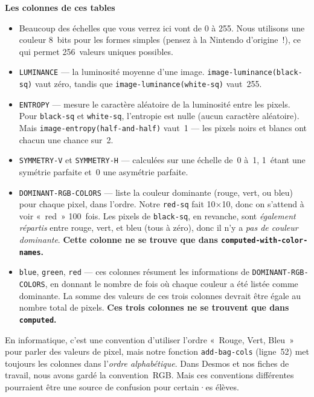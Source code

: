 \documentclass[12pt,a4paper]{article}
\begin{document}
\begin{keypointbox}
  \textbf{Les colonnes de ces tables}

  \begin{itemize}
    \item Beaucoup des échelles que vous verrez ici vont de 0 à 255. Nous utilisons une couleur 8~bits pour les formes simples (pensez à la Nintendo d'origine~!), ce qui permet 256~valeurs uniques possibles.
    \item \texttt{LUMINANCE} — la luminosité moyenne d'une image. \texttt{image-luminance(black-sq)} vaut zéro, tandis que \texttt{image-luminance(white-sq)} vaut~255.
    \item \texttt{ENTROPY} — mesure le caractère aléatoire de la luminosité entre les pixels. Pour \texttt{black-sq} et \texttt{white-sq}, l'entropie est nulle (aucun caractère aléatoire). Mais \texttt{image-entropy(half-and-half)} vaut~1 — les pixels noirs et blancs ont chacun une chance sur~2.
    \item \texttt{SYMMETRY-V} et \texttt{SYMMETRY-H} — calculées sur une échelle de~0 à~1, 1~étant une symétrie parfaite et~0 une asymétrie parfaite.
    \item \texttt{DOMINANT-RGB-COLORS} — liste la couleur dominante (rouge, vert, ou bleu) pour chaque pixel, dans l'ordre. Notre \texttt{red-sq} fait 10$\times$10, donc on s'attend à voir «~red~» 100~fois. Les pixels de \texttt{black-sq}, en revanche, sont \emph{également répartis} entre rouge, vert, et bleu (tous à zéro), donc il n'y a \emph{pas de couleur dominante}. \textbf{Cette colonne ne se trouve que dans \texttt{computed-with-color-names}.}
    \item \texttt{blue}, \texttt{green}, \texttt{red} — ces colonnes résument les informations de \texttt{DOMINANT-RGB-COLORS}, en donnant le nombre de fois où chaque couleur a été listée comme dominante. La somme des valeurs de ces trois colonnes devrait être égale au nombre total de pixels. \textbf{Ces trois colonnes ne se trouvent que dans \texttt{computed}.}
  \end{itemize}

  \vspace{0.3em}
  En informatique, c'est une convention d'utiliser l'ordre «~Rouge, Vert, Bleu~» pour parler des valeurs de pixel, mais notre fonction \texttt{add-bag-cols} (ligne~52) met toujours les colonnes dans l'\emph{ordre alphabétique}. Dans Desmos et nos fiches de travail, nous avons gardé la convention~RGB. Mais ces conventions différentes pourraient être une source de confusion pour certain·es élèves.
\end{keypointbox}
\end{document}

